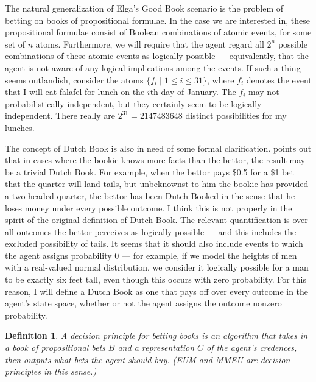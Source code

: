 \documentclass[letterpaper,12pt]{article}
\renewcommand{\phi}{\varphi}
\newtheorem{definition}{Definition}
\begin{document}
The natural generalization of Elga's Good Book scenario is the problem of betting on books of propositional formulae. In the case we are interested in, these propositional formulae consist of Boolean combinations of atomic events, for some set of $n$ atoms. Furthermore, we will require that the agent regard all $2^n$ possible combinations of these atomic events as logically possible --- equivalently, that the agent is not aware of any logical implications among the events. If such a thing seems outlandish, consider the atoms $\{f_i \mid 1 \leq i \leq 31\}$, where $f_i$ denotes the event that I will eat falafel for lunch on the $i$th day of January. The $f_i$ may not probabilistically independent, but they certainly seem to be logically independent. There really are $2^{31} = 2147483648$ distinct possibilities for my lunches.


The concept of Dutch Book is also in need of some formal clarification. \cite{hacking1967} points out that in cases where the bookie knows more facts than the bettor, the result may be a trivial Dutch Book. For example, when the bettor pays \$0.5 for a \$1 bet that the quarter will land tails, but unbeknownst to him the bookie has provided a two-headed quarter, the bettor has been Dutch Booked in the sense that he loses money under every possible outcome. I think this is not properly in the spirit of the original definition of Dutch Book. The relevant quantification is over all outcomes the bettor perceives as logically possible --- and this includes the excluded possibility of tails. It seems that it should also include events to which the agent assigns probability $0$ --- for example, if we model the heights of men with a real-valued normal distribution, we consider it logically possible for a man to be exactly six feet tall, even though this occurs with zero probability. For this reason, I will define a Dutch Book as one that pays off over every outcome in the agent's state space, whether or not the agent assigns the outcome nonzero probability.

\begin{definition}
\label{decisionPrinciple}
A \emph{decision principle} for betting books is an algorithm that takes in a book of propositional bets $B$ and a representation $C$ of the agent's credences, then outputs what bets the agent should buy. (EUM and MMEU are decision principles in this sense.)
\end{definition}
\end{document}
